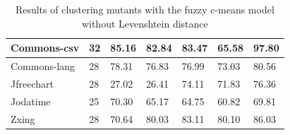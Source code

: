\documentclass[conference,draftclsnofoot,onecolumn]{IEEEtran}
\begin{document}
\begin{table}[ht]
\begin{tabular}{|l|l|l|l|l|l|l|}
Commons-csv           & 32                   & 85.16                           & 82.84                                                & 83.47                            & 65.58                                                                                                                                    & 97.80                                                                                                                                    \\ \hline
Commons-lang          & 28                   & 78.31                           & 76.83                                                & 76.99                            & 73.03                                                                                                                                    & 80.56                                                                                                                                    \\ \hline
Jfreechart            & 28                   & 27.02                           & 26.41                                                & 74.11                            & 71.83                                                                                                                                    & 76.36                                                                                                                                    \\ \hline
Jodatime              & 25                   & 70.30                           & 65.17                                                & 64.75                            & 60.82                                                                                                                                    & 69.81                                                                                                                                    \\ \hline
Zxing                 & 28                   & 70.64                           & 80.03                                                & 83.11                            & 80.10                                                                                                                                    & 86.03                                                                                                                                    \\ \hline
\end{tabular}
\caption{\label{tab:ml_no_distance}Results of clustering mutants with the fuzzy c-means model without Levenshtein distance}
\end{table}
\end{document}
